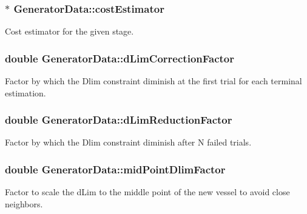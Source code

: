 \subsubsection[{\texorpdfstring{cost\+Estimator}{costEstimator}}]{$\ast$ Generator\+Data\+::cost\+Estimator}\hypertarget{class_generator_data_ae53d997a63beead78dfa9991776114d0}{}\label{class_generator_data_ae53d997a63beead78dfa9991776114d0}
Cost estimator for the given stage. 
\subsubsection[{\texorpdfstring{d\+Lim\+Correction\+Factor}{dLimCorrectionFactor}}]{\setlength{\rightskip}{0pt plus 5cm}double Generator\+Data\+::d\+Lim\+Correction\+Factor}\hypertarget{class_generator_data_acebada3bce68b5fe40de8f043cee6885}{}\label{class_generator_data_acebada3bce68b5fe40de8f043cee6885}
Factor by which the Dlim constraint diminish at the first trial for each terminal estimation. 
\subsubsection[{\texorpdfstring{d\+Lim\+Reduction\+Factor}{dLimReductionFactor}}]{\setlength{\rightskip}{0pt plus 5cm}double Generator\+Data\+::d\+Lim\+Reduction\+Factor}\hypertarget{class_generator_data_ace303215d8d8fc30af68e3c578806d80}{}\label{class_generator_data_ace303215d8d8fc30af68e3c578806d80}
Factor by which the Dlim constraint diminish after N failed trials. 
\subsubsection[{\texorpdfstring{mid\+Point\+Dlim\+Factor}{midPointDlimFactor}}]{\setlength{\rightskip}{0pt plus 5cm}double Generator\+Data\+::mid\+Point\+Dlim\+Factor}\hypertarget{class_generator_data_a9241df122476b5e2449ce4542e5b0e68}{}\label{class_generator_data_a9241df122476b5e2449ce4542e5b0e68}
Factor to scale the d\+Lim to the middle point of the new vessel to avoid close neighbors. 
